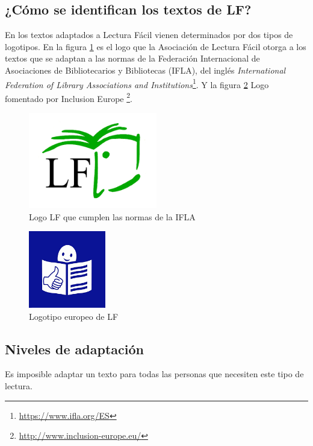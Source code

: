 \subsection{¿Cómo se identifican los textos de LF?}
En los textos adaptados a Lectura Fácil vienen determinados por dos tipos de logotipos. En la figura \ref{fig:IFLA} es el logo que la Asociación de Lectura Fácil otorga a los textos que se adaptan a las normas de la Federación Internacional de Asociaciones de Bibliotecarios y Bibliotecas (IFLA), del inglés \textit{International Federation of Library Associations and Institutions}\footnote{\href{https://www.ifla.org/ES}{https://www.ifla.org/ES}}. Y la figura  \ref{fig:logoEuropeo}
Logo fomentado por Inclusion Europe \footnote{\href{http://www.inclusion-europe.eu/}{http://www.inclusion-europe.eu/}}.
\begin{figure}[htb]
\centering
	\includegraphics[width=0.5\textwidth]{Imagenes/Logos/indice}
	\caption{Logo LF que cumplen las normas de la IFLA}
	\label{fig:IFLA}
\end{figure} 
\begin{figure}[htb]
	\centering
	\includegraphics[width=0.3\textwidth]{Imagenes/Logos/indice2}
	\caption{Logotipo europeo de LF}
	\label{fig:logoEuropeo}
\end{figure} 




\subsection{Niveles de adaptación}
Es imposible adaptar un texto para todas las personas que necesiten este tipo de lectura.
 
